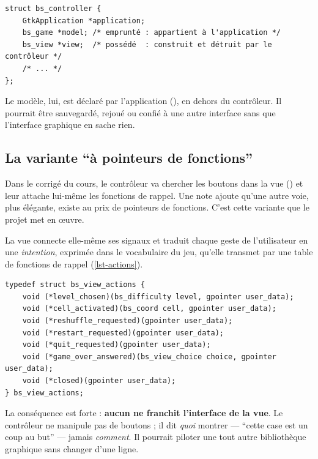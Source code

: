 \begin{lstlisting}[caption={La structure du contrôleur (\fichier{src/ui/controller.c}).},
                   label={lst-controleur}]
struct bs_controller {
    GtkApplication *application;
    bs_game *model; /* emprunté : appartient à l'application */
    bs_view *view;  /* possédé  : construit et détruit par le contrôleur */
    /* ... */
};
\end{lstlisting}

Le modèle, lui, est déclaré par l'application (), en dehors du
contrôleur. Il pourrait être sauvegardé, rejoué ou confié à une autre interface sans que
l'interface graphique en sache rien.

\subsection{La variante \enquote{à pointeurs de fonctions}}
\label{sec-pointeurs}

Dans le corrigé du cours, le contrôleur va chercher les boutons dans la vue
() et leur attache lui-même les fonctions de rappel. Une note
ajoute qu'une autre voie, plus élégante, existe au prix de pointeurs de fonctions. C'est
cette variante que le projet met en œuvre.

La vue connecte elle-même ses signaux et traduit chaque geste de l'utilisateur en une
\emph{intention}, exprimée dans le vocabulaire du jeu, qu'elle transmet par une table de
fonctions de rappel (\cref{lst-actions}).

\begin{lstlisting}[caption={Les intentions rapportées par la vue (\fichier{src/ui/view.h}).},
                   label={lst-actions}]
typedef struct bs_view_actions {
    void (*level_chosen)(bs_difficulty level, gpointer user_data);
    void (*cell_activated)(bs_coord cell, gpointer user_data);
    void (*reshuffle_requested)(gpointer user_data);
    void (*restart_requested)(gpointer user_data);
    void (*quit_requested)(gpointer user_data);
    void (*game_over_answered)(bs_view_choice choice, gpointer user_data);
    void (*closed)(gpointer user_data);
} bs_view_actions;
\end{lstlisting}

La conséquence est forte : \textbf{aucun  ne franchit l'interface de la
    vue}. Le contrôleur ne manipule pas de boutons ; il dit \emph{quoi} montrer --- \enquote{cette
    case est un coup au but} --- jamais \emph{comment}. Il pourrait piloter une tout autre
bibliothèque graphique sans changer d'une ligne.

